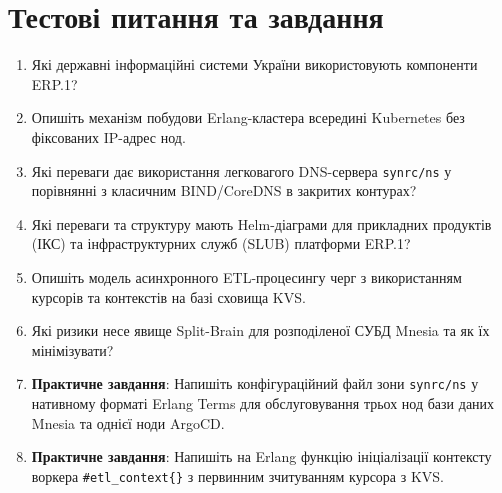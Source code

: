 \section{Тестові питання та завдання}
\begin{enumerate}
    \item Які державні інформаційні системи України використовують компоненти ERP.1?
    \item Опишіть механізм побудови Erlang-кластера всередині Kubernetes без фіксованих IP-адрес нод.
    \item Які переваги дає використання легковагого DNS-сервера \texttt{synrc/ns} у порівнянні з класичним BIND/CoreDNS в закритих контурах?
    \item Які переваги та структуру мають Helm-діаграми для прикладних продуктів (ІКС) та інфраструктурних служб (SLUB) платформи ERP.1?
    \item Опишіть модель асинхронного ETL-процесингу черг з використанням курсорів та контекстів на базі сховища KVS.
    \item Які ризики несе явище Split-Brain для розподіленої СУБД Mnesia та як їх мінімізувати?
    \item \textbf{Практичне завдання}: Напишіть конфігураційний файл зони \texttt{synrc/ns} у нативному форматі Erlang Terms для обслуговування трьох нод бази даних Mnesia та однієї ноди ArgoCD.
    \item \textbf{Практичне завдання}: Напишіть на Erlang функцію ініціалізації контексту воркера \texttt{\#etl\_context\{\}} з первинним зчитуванням курсора з KVS.
\end{enumerate}
